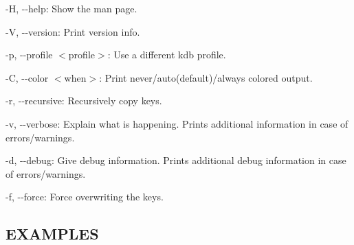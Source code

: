 \begin{DoxyItemize}
\item {\ttfamily -\/H}, {\ttfamily -\/-\/help}\+: Show the man page.
\item {\ttfamily -\/V}, {\ttfamily -\/-\/version}\+: Print version info.
\item {\ttfamily -\/p}, {\ttfamily -\/-\/profile $<$profile$>$}\+: Use a different kdb profile.
\item {\ttfamily -\/C}, {\ttfamily -\/-\/color $<$when$>$}\+: Print never/auto(default)/always colored output.
\item {\ttfamily -\/r}, {\ttfamily -\/-\/recursive}\+: Recursively copy keys.
\item {\ttfamily -\/v}, {\ttfamily -\/-\/verbose}\+: Explain what is happening. Prints additional information in case of errors/warnings.
\item {\ttfamily -\/d}, {\ttfamily -\/-\/debug}\+: Give debug information. Prints additional debug information in case of errors/warnings.
\item {\ttfamily -\/f}, {\ttfamily -\/-\/force}\+: Force overwriting the keys.
\end{DoxyItemize}

\subsection*{E\+X\+A\+M\+P\+L\+ES}


